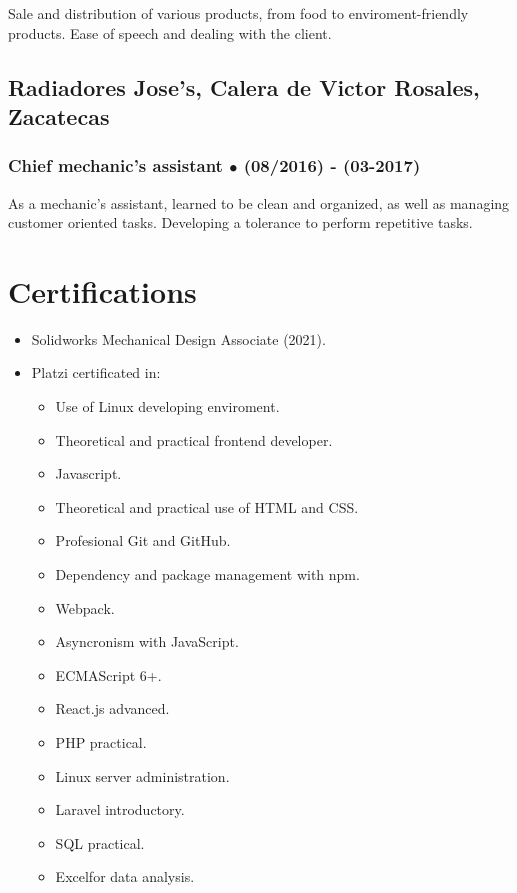 \documentclass{article}
\begin{document}
  Sale and distribution of various products, from food to enviroment-friendly products. Ease of speech and dealing with the client.

  \subsection{\textbf{Radiadores Jose's}, Calera de Victor Rosales, Zacatecas}

  \subsubsection{Chief mechanic's assistant $\bullet$ (08/2016) - (03-2017)}

  As a mechanic's assistant, learned to be clean and organized, as well as managing customer oriented tasks. Developing a tolerance to perform repetitive tasks.%


  \section{Certifications}%

  \begin{itemize}
    \item Solidworks Mechanical Design Associate (2021).
    \item Platzi certificated in:

      \begin{multicols}{2}
      \begin{itemize}
        \item Use of Linux developing enviroment.
        \item Theoretical and practical frontend developer.
        \item Javascript.
        \item Theoretical and practical use of HTML and CSS.
        \item Profesional Git and GitHub.
        \item Dependency and package management with npm.
        \item Webpack.
        \item Asyncronism with JavaScript.
        \item ECMAScript 6+.
        \item React.js advanced.
        \item PHP practical.
        \item Linux server administration.
        \item Laravel introductory.
        \item SQL practical.
        \item Excelfor data analysis.
      \end{itemize}
      \end{multicols}
  \end{itemize}%
\end{document}
